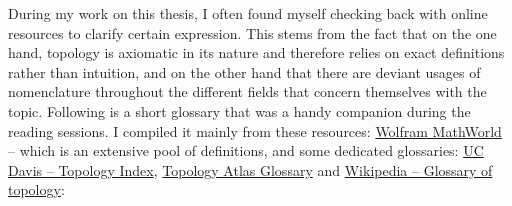 During my work on this thesis, I often found myself checking back with online resources to clarify certain expression.
This stems from the fact that on the one hand, topology is axiomatic in its nature and therefore relies on exact definitions rather than intuition, and on the other hand that there are deviant usages of nomenclature throughout the different fields that concern themselves with the topic.
Following is a short glossary that was a handy companion during the reading sessions.
I compiled it mainly from these resources: \href{http://mathworld.wolfram.com}{Wolfram MathWorld} -- which is an extensive pool of definitions, and some dedicated glossaries: \href{http://www.math.ucdavis.edu/profiles/glossary.html}{UC Davis -- Topology Index}, \href{http://www.ornl.gov/sci/ortep/topology/defs.txt}{Topology Atlas Glossary} and \href{http://en.wikipedia.org/wiki/Glossary_of_topology}{Wikipedia -- Glossary of topology}:
\vspace*{1ex}
